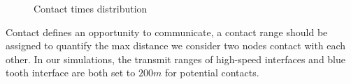 \begin{figure}[!t]
\centering
{}
\caption{Contact times distribution}\label{figure_contact_ict}
\end{figure}
Contact defines an opportunity to communicate, a contact range should be assigned to quantify the max distance we consider two nodes contact with each other. 
In our simulations, the transmit ranges of high-speed interfaces and blue tooth interface are both set to $200m$ for potential contacts. 

